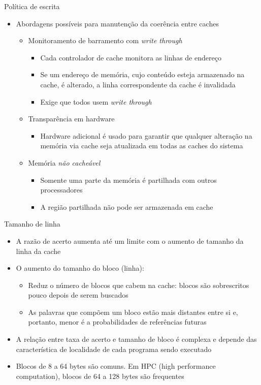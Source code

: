 \begin{slide}{Política de escrita}
\begin{itemize}
   \item Abordagens possíveis para manutenção da coerência entre caches
   \begin{itemize}
      \item Monitoramento de barramento com \emph{write through}
      \begin{itemize}
         \item Cada controlador de cache monitora as linhas de endereço 
         \item Se um endereço de memória, cujo conteúdo esteja armazenado na cache, é alterado, a linha correspondente da cache é invalidada
         \item Exige que todos usem \emph{write through}
      \end{itemize}
      \item Transparência em hardware
      \begin{itemize}
         \item Hardware adicional é usado para garantir que qualquer alteração na memória via cache seja atualizada em todas as caches do sistema
      \end{itemize}
      \item Memória \emph{não cacheável}
      \begin{itemize}
         \item Somente uma parte da memória é partilhada com outros processadores
         \item A região partilhada não pode ser armazenada em cache
      \end{itemize}
   \end{itemize}
\end{itemize}
\end{slide}

\begin{slide}{Tamanho de linha}
	\begin{itemize}
		\item A razão de acerto aumenta até um limite com o aumento de tamanho da linha da cache
		\item O aumento do tamanho do bloco (linha):
			\begin{itemize}
				\item Reduz o número de blocos que cabem na cache: blocos são sobrescritos pouco depois de serem buscados
				\item As palavras que compõem um bloco estão mais distantes entre si e, portanto, menor é a probabilidades de referências futuras
			\end{itemize}
		\item A relação entre taxa de acerto e tamanho de bloco é complexa e depende das característica de localidade de cada programa sendo executado
		\item Blocos de 8 a 64 bytes são comuns. Em HPC (high performance computation), blocos de 64 a 128 bytes são frequentes
	\end{itemize}
\end{slide}

